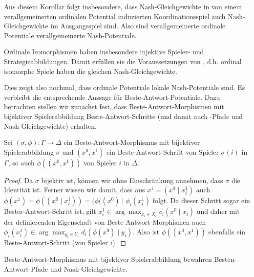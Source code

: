 
Aus diesem Korollar folgt insbesondere, dass Nash-Gleichgewichte in von einem verallgemeinerten ordinalen Potential induzierten Koordinationsspiel auch Nash-Gleichgewichte im Ausgangsspiel sind. Also sind verallgemeinerte ordinale Potentiale verallgemeinerte Nash-Potentiale.

\begin{bsp}
	Ordinale Isomorphismen haben insbesondere injektive Spieler- und Strategieabbildungen. Damit erfüllen sie die Voraussetzungen von , d.h. ordinal isomorphe Spiele haben die gleichen Nash-Gleichgewichte.
\end{bsp}

Dies zeigt also nochmal, dass ordinale Potentiale lokale Nash-Potentiale sind. Es verbleibt die entsprechende Aussage für Beste-Antwort-Potentiale. Dazu betrachten stellen wir zunächst fest, dass Beste-Antwort-Morphismen mit bijektiver Spielerabbildung Beste-Antwort-Schritte (und damit auch -Pfade und Nash-Gleichgewichte) erhalten.

\begin{prop}\label{prop:BAMorphErhBASchritte}
	Sei $(\sigma, \phi): \Gamma \to \Delta$ ein Beste-Antwort-Morphismus mit bijektiver Spielerabbildung $\sigma$ und $(x^0, x^1)$ ein Beste-Antwort-Schritt von Spieler $\sigma(i)$ in $\Gamma$, so auch $\phi((x^0, x^1))$ von Spieler $i$ in $\Delta$.
\end{prop}

\begin{proof}
	Da $\sigma$ bijektiv ist, können wir ohne Einschränkung annehmen, dass $\sigma$ die Identität ist. Ferner wissen wir damit, dass aus $x^1 = (x^0 \mid x^1_i)$ auch $\phi(x^1) = \phi((x^0 \mid x^1_i)) = (\phi((x^0) \mid \phi_i(x^1_i)$ folgt. Da dieser Schritt sogar ein Bester-Antwort-Schritt ist, gilt $x^1_i \in \arg\max_{x_i \in X_i} c_i(x^0 \mid x_i)$ und daher mit der definierenden Eigenschaft von Beste-Antwort-Morphismen auch $\phi_i(x^1_i) \in \arg\max_{y_i \in Y_i} d_i(\phi(x^0) \mid y_i)$. Also ist $\phi((x^0, x^1))$ ebenfalls ein Beste-Antwort-Schritt (von Spieler $i$).
\end{proof}

\begin{kor}
	Beste-Antwort-Morphismus mit bijektiver Spielerabbildung bewahren Besten-Antwort-Pfade und Nash-Gleichgewichte.
\end{kor}


